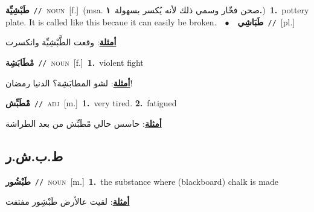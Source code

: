 \documentclass[10pt,a4paper,twoside]{article} %
\begin{document}
\begin{multicols}{2}
{\setlength\topsep{0pt}\textbf{\foreignlanguage{arabic}{طَبْشِيِّة}}\ {\color{gray}\texttt{//}\color{black}}\ \textsc{noun}\ [f.]\ \color{gray}(msa. \foreignlanguage{arabic}{صحن فخّار وسمي ذلك لأنه يُكسر بسهولة}~\foreignlanguage{arabic}{\textbf{١.}})\color{black}\ \textbf{1.}~pottery plate. It is called like this becaue it can easily be broken.\ \ $\bullet$\ \ \setlength\topsep{0pt}\textbf{\foreignlanguage{arabic}{طَبَاشِي}}\ {\color{gray}\texttt{//}\color{black}}\ [pl.]\  \begin{flushright}\color{gray}\foreignlanguage{arabic}{\textbf{\underline{\foreignlanguage{arabic}{أمثلة}}}: وقعت الطَّبْشِيِّة وانكسرت}\end{flushright}\color{black}} \vspace{2mm}

{\setlength\topsep{0pt}\textbf{\foreignlanguage{arabic}{مْطَابَشِة}}\ {\color{gray}\texttt{//}\color{black}}\ \textsc{noun}\ [f.]\ \textbf{1.}~violent fight\  \begin{flushright}\color{gray}\foreignlanguage{arabic}{\textbf{\underline{\foreignlanguage{arabic}{أمثلة}}}: لشو المطابَشِة؟ الدنيا رمضان!}\end{flushright}\color{black}} \vspace{2mm}

{\setlength\topsep{0pt}\textbf{\foreignlanguage{arabic}{مْطَبِّش}}\ {\color{gray}\texttt{//}\color{black}}\ \textsc{adj}\ [m.]\ \textbf{1.}~very tired.  \textbf{2.}~fatigued\  \begin{flushright}\color{gray}\foreignlanguage{arabic}{\textbf{\underline{\foreignlanguage{arabic}{أمثلة}}}: حاسس حالي مْطَبِّش من بعد الطراشة}\end{flushright}\color{black}} \vspace{2mm}

\vspace{-3mm}
\subsection*{\color{blue}\foreignlanguage{arabic}{ط.ب.ش.ر}\color{blue}{}} 

{\setlength\topsep{0pt}\textbf{\foreignlanguage{arabic}{طَبْشُور}}\ {\color{gray}\texttt{//}\color{black}}\ \textsc{noun}\ [m.]\ \textbf{1.}~the substance where (blackboard) chalk is made\  \begin{flushright}\color{gray}\foreignlanguage{arabic}{\textbf{\underline{\foreignlanguage{arabic}{أمثلة}}}: لقيت عالأرض طَبْشِور مفتفت}\end{flushright}\color{black}} \vspace{2mm}


\end{multicols}
\end{document}
